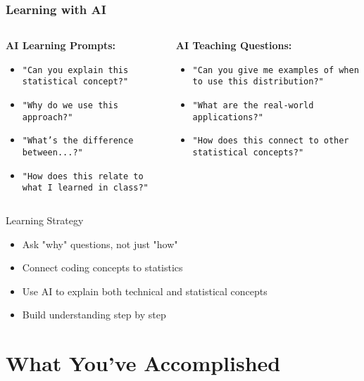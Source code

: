 \documentclass[aspectratio=169]{beamer}
\begin{document}
\begin{frame}
\frametitle{Learning with AI}
\begin{columns}
\begin{column}{0.5\textwidth}
\textbf{AI Learning Prompts:}
\begin{itemize}
\item \texttt{"Can you explain this statistical concept?"}
\item \texttt{"Why do we use this approach?"}
\item \texttt{"What's the difference between...?"}
\item \texttt{"How does this relate to what I learned in class?"}
\end{itemize}
\end{column}
\begin{column}{0.5\textwidth}
\textbf{AI Teaching Questions:}
\begin{itemize}
\item \texttt{"Can you give me examples of when to use this distribution?"}
\item \texttt{"What are the real-world applications?"}
\item \texttt{"How does this connect to other statistical concepts?"}
\end{itemize}
\end{column}
\end{columns}

\begin{alertblock}{Learning Strategy}
\begin{itemize}
\item Ask "why" questions, not just "how"
\item Connect coding concepts to statistics
\item Use AI to explain both technical and statistical concepts
\item Build understanding step by step
\end{itemize}
\end{alertblock}
\end{frame}

\section{What You've Accomplished}
\end{document}
